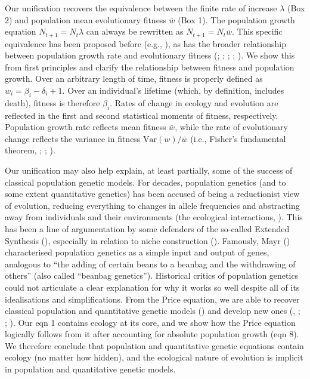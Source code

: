 \documentclass[
]{article}
\begin{document}
Our unification recovers the equivalence between the finite rate of
increase \(\lambda\) (Box 2) and population mean evolutionary fitness
\(\bar{w}\) (Box 1). The population growth equation
\(N_{t+1} = N_{t}\lambda\) can always be rewritten as
\(N_{t+1} = N_{t}\bar{w}\). This specific equivalence has been proposed
before (e.g., ), as has the broader
relationship between population growth rate and evolutionary fitness
(;
;
; ; ). We show this from first
principles and clarify the relationship between fitness and population
growth. Over an arbitrary length of time, fitness is properly defined as
\(w_{i} = \beta_{i} - \delta_{i} + 1\). Over an individual's lifetime
(which, by definition, includes death), fitness is therefore
\(\beta_{i}\). Rates of change in ecology and evolution are reflected in
the first and second statistical moments of fitness, respectively.
Population growth rate reflects mean fitness \(\bar{w}\), while the rate
of evolutionary change reflects the variance in fitness
\(\mathrm{Var}(w)/\bar{w}\) (i.e., Fisher's fundamental theorem,
; ; ).

Our unification may also help explain, at least partially, some of the
success of classical population genetic models. For decades, population
genetics (and to some extent quantitative genetics) has been accused of
being a reductionist view of evolution, reducing everything to changes
in allele frequencies and abstracting away from individuals and their
environments (the ecological interactions,
). This has been a line of
argumentation by some defenders of the so-called Extended Synthesis
(), especially in relation
to niche construction (). Famously, Mayr () characterised
population genetics as a simple input and output of genes, analogous to
``the adding of certain beans to a beanbag and the withdrawing of
others'' (also called ``beanbag genetics''). Historical critics of
population genetics could not articulate a clear explanation for why it
works so well despite all of its idealisations and simplifications. From
the Price equation, we are able to recover classical population and
quantitative genetic models ()
and develop new ones (,
; ;
). Our eqn 1 contains ecology at its
core, and we show how the Price equation logically follows from it after
accounting for absolute population growth (eqn 8). We therefore conclude
that population and quantitative genetic equations contain ecology (no
matter how hidden), and the ecological nature of evolution is implicit
in population and quantitative genetic models.
\end{document}

